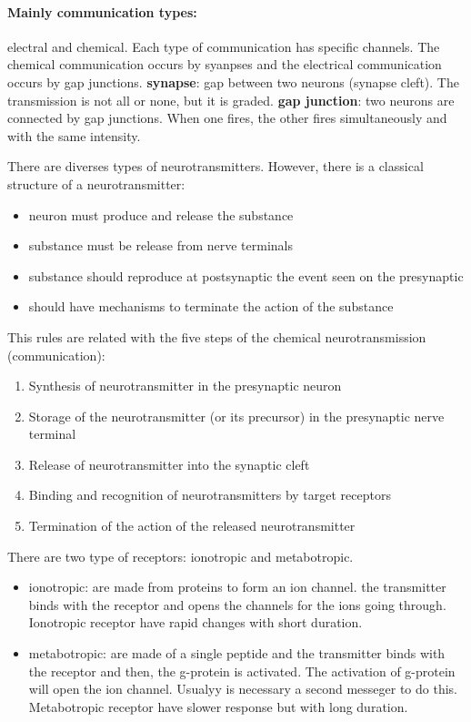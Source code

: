\documentclass[12pt,article,oneside,a4paper]{memoir}
\begin{document}
\paragraph{Mainly communication types:} electral and chemical. Each type of communication has specific channels. The chemical communication occurs by syanpses and the electrical communication occurs by gap junctions.
\textbf{synapse}: gap between two neurons (synapse cleft). The transmission is not all or none, but it is graded.
\textbf{gap junction}: two neurons are connected by gap junctions. When one fires, the other fires simultaneously and with the same intensity.

There are diverses types of neurotransmitters. However, there is a classical structure of a neurotransmitter:
\begin{itemize}
\item neuron must produce and release the substance
\item substance must be release from nerve terminals
\item substance should reproduce at postsynaptic the event seen on the presynaptic
\item should have mechanisms to terminate the action of the substance
\end{itemize}

This rules are related with the five steps of the chemical neurotransmission (communication):
\begin{enumerate}
\item Synthesis of neurotransmitter in the presynaptic neuron
\item Storage of the neurotransmitter (or its precursor) in the presynaptic nerve terminal
\item Release of neurotransmitter into the synaptic cleft
\item Binding and recognition of neurotransmitters by target receptors
\item Termination of the action of the released neurotransmitter
\end{enumerate}

There are two type of receptors: ionotropic and metabotropic.
\begin{itemize}
\item ionotropic: are made from proteins to form an ion channel. the transmitter binds with the receptor and opens the channels for the ions going through. Ionotropic receptor have rapid changes with short duration.
\item metabotropic: are made of a single peptide and the transmitter binds with the receptor and then, the g-protein is activated. The activation of g-protein will open the ion channel. Usualyy is necessary a second messeger to do this. Metabotropic receptor have slower response but with long duration.
\end{itemize}
\end{document}
